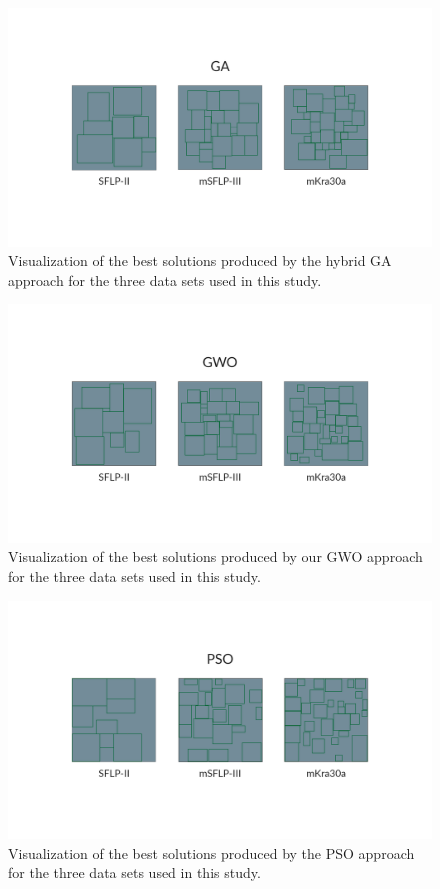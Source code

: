 \begin{figure}[h!]
\centering
\includegraphics[scale=1.0]{./images/chap07-rd/ga-best-solutions.png}
\caption{Visualization of the best solutions produced by the hybrid GA approach for the three data sets used in this study.}
\label{best-results-ga}
\end{figure}

\begin{figure}[h!]
\centering
\includegraphics[scale=1.0]{./images/chap07-rd/gwo-best-solutions.png}
\caption{Visualization of the best solutions produced by our GWO approach for the three data sets used in this study.}
\label{best-results-gwo}
\end{figure}

\begin{figure}[h!]
\centering
\includegraphics[scale=1.0]{./images/chap07-rd/pso-best-solutions.png}
\caption{Visualization of the best solutions produced by the PSO approach for the three data sets used in this study.}
\label{best-results-pso}
\end{figure}

